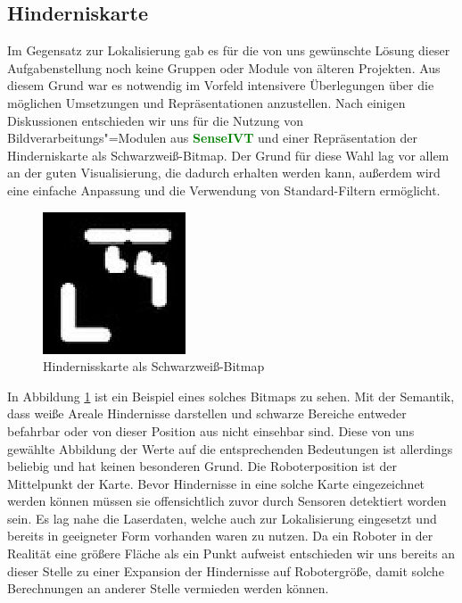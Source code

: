 \subsection{Hinderniskarte}
\label{hinderniskarte_subsec}
 Im Gegensatz zur Lokalisierung gab es für die von uns gewünschte Lösung dieser
 Aufgabenstellung noch keine Gruppen oder Module von älteren Projekten. Aus
 diesem Grund war es notwendig im Vorfeld intensivere Überlegungen über die möglichen
 Umsetzungen und Repräsentationen anzustellen.
 Nach einigen Diskussionen entschieden wir uns für die Nutzung von
 Bildverarbeitungs"=Modulen aus \textcolor{green}{\textbf{SenseIVT}}  und
 einer Repräsentation der Hinderniskarte als Schwarzweiß-Bitmap. Der Grund für diese Wahl lag vor allem an der guten
 Visualisierung, die dadurch erhalten werden kann, außerdem wird eine einfache Anpassung und die Verwendung
 von Standard-Filtern ermöglicht. 
\begin{figure}[h]
\center
\includegraphics[scale=0.7]{graphics/hinderniskarte.jpg}
\caption{\label{fig:hinderniskarte} Hindernisskarte als Schwarzweiß-Bitmap}
\end{figure}
 In Abbildung \ref{fig:hinderniskarte} ist ein Beispiel eines solches Bitmaps
 zu sehen. Mit der Semantik, dass weiße Areale Hindernisse darstellen und schwarze Bereiche entweder befahrbar
 oder von dieser Position aus nicht einsehbar sind. Diese von uns gewählte Abbildung der Werte
 auf die entsprechenden Bedeutungen ist allerdings beliebig und hat keinen besonderen Grund.
 Die Roboterposition ist der Mittelpunkt der Karte. Bevor Hindernisse in eine solche Karte eingezeichnet werden
 können müssen sie offensichtlich zuvor durch Sensoren detektiert worden sein. Es lag nahe die Laserdaten,
 welche auch zur Lokalisierung eingesetzt und bereits in geeigneter Form vorhanden waren zu nutzen.
 Da ein Roboter in der Realität eine größere Fläche als ein Punkt aufweist entschieden wir uns bereits an dieser
 Stelle zu einer Expansion der Hindernisse auf Robotergröße, damit solche Berechnungen an anderer Stelle vermieden
 werden können.

